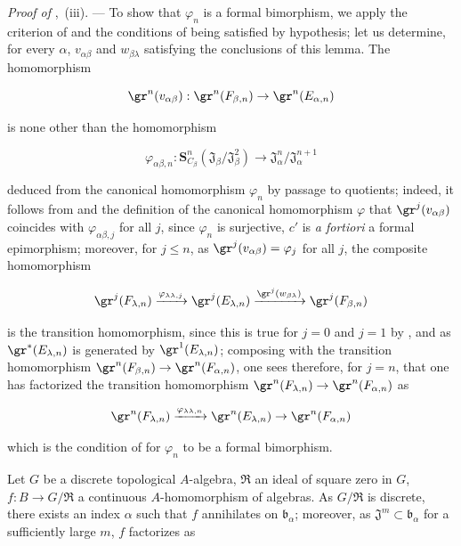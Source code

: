 \begin{env}[19.5.6.8]
\label{0.19.5.6.8}
\emph{Proof of} ,~(iii). ---
To show that $\varphi_n$ is a formal bimorphism, we apply the criterion of  and the conditions of  being satisfied by hypothesis; let us determine, for every $\alpha$, $v_{\alpha\beta}$ and $w_{\beta\lambda}$ satisfying the conclusions of this lemma.
The homomorphism

\[
\gr^n(v_{\alpha\beta}):\gr^n(F_{\beta,n}) \to \gr^n(E_{\alpha,n})
\]

is none other than the homomorphism

\[
\varphi_{\alpha\beta,n}:\mathbf{S}_{C_\beta}^n(\mathfrak{J}_\beta/\mathfrak{J}_\beta^2)\to\mathfrak{J}_\alpha^n/\mathfrak{J}_\alpha^{n+1}
\]

deduced from the canonical homomorphism $\varphi_n$  by passage to quotients;
indeed, it follows from  and the definition of the canonical homomorphism $\varphi$ that $\gr^j(v_{\alpha\beta})$ coincides with $\varphi_{\alpha\beta,j}$ for all $j$,
since $\varphi_n$ is surjective, $c'$ is \emph{a fortiori} a formal epimorphism;
moreover, for $j\leq n$, as $\gr^j(v_{\alpha\beta})=\varphi_j$ for all $j$, the composite homomorphism

\[
\gr^j(F_{\lambda,n}) \xrightarrow{\varphi_{\lambda\lambda,j}} \gr^j(E_{\lambda,n}) \xrightarrow{\gr^j(w_{\beta\lambda})} \gr^j(F_{\beta,n})
\]

is the transition homomorphism, since this is true for $j=0$ and $j=1$ by , and as $\gr^*(E_{\lambda,n})$ is generated by $\gr^1(E_{\lambda,n})$; composing with the transition homomorphism $\gr^n(F_{\beta,n})\to\gr^n(F_{\alpha,n})$, one sees therefore, for $j=n$, that one has factorized the transition homomorphism $\gr^n(F_{\lambda,n})\to\gr^n(F_{\alpha,n})$ as

\[
\gr^n(F_{\lambda,n}) \xrightarrow{\varphi_{\lambda\lambda,n}} \gr^n(E_{\lambda,n}) \to \gr^n(F_{\alpha,n})
\]

which is the condition of  for $\varphi_n$ to be a formal bimorphism.
\end{env}

Let $G$ be a discrete topological $A$-algebra, $\mathfrak{R}$ an ideal of square zero in $G$, $f:B\to G/\mathfrak{R}$ a continuous $A$-homomorphism of algebras.
As $G/\mathfrak{R}$ is discrete, there exists an index $\alpha$ such that $f$ annihilates on $\mathfrak{b}_\alpha$; moreover, as $\mathfrak{J}^m\subset\mathfrak{b}_\alpha$ for a sufficiently large $m$, $f$ factorizes as

